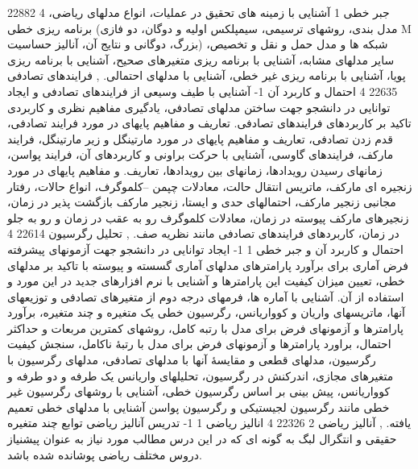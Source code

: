 \documentclass[class=article, crop=false]{standalone}
\begin{document}
{{{        }{
            22882
        }{
            4
        }{
            جبر خطی 1
        }{}{{
            آشنایی با زمینه های تحقیق در عملیات، انواع مدلهای ریاضی، برنامه ریزی خطی (مدل بندی، روشهای ترسیمی، سیمپلکس اولیه و دوگان، دو فازی M بزرگ، دوگانی و نتایج آن، آنالیز حساسیت) شبکه ها و مدل حمل و نقل و تخصیص، سایر مدلهای مشابه، آشنایی با برنامه ریزی متغیرهای صحیح، آشنایی با برنامه ریزی پویا، آشنایی با برنامه ریزی غیر خطی، آشنایی با مدلهای احتمالی.
        }}
        },{{
            فرایندهای تصادفی
        }{
            22635
        }{
            4
        }{
            احتمال و کاربرد آن
        }{{
            1- آشنایی با طیف وسیعی از فرایندهای تصادفی و ایجاد توانایی در دانشجو جهت ساختن مدلهای تصادفی، یادگیری مفاهیم نظری و کاربردی تاکید بر کاربردهای فرایندهای تصادفی.
        }}{{
            تعاریف و مفاهیم پایهای در مورد فرایند تصادفی، قدم زدن تصادفی، تعاریف و مفاهیم پایهای در مورد مارتینگل و زیر مارتینگل، فرایند مارکف، فرایندهای گاوسی، آشنایی با حرکت براونی و کاربردهای آن، فرایند پواسن، زمانهای رسیدن رویدادها، زمانهای بین رویدادها، تعاریف. و مفاهیم پایهای در مورد زنجیره ای مارکف، ماتریس انتقال حالت، معادلات چپمن –کلموگرف، انواع حالات، رفتار مجانبی زنجیر مارکف، احتمالهای حدی و ایستا، زنجیر مارکف بازگشت پذیر در زمان، زنجیرهای مارکف پیوسته در زمان، معادلات کلموگرف رو به عقب در زمان و رو به جلو در زمان، کاربردهای فرایندهای تصادفی مانند نظریه صف.
        }}
        },{{
            تحلیل رگرسیون
        }{
            22614
        }{
            4
        }{
            احتمال و کاربرد آن و جبر خطی 1
        }{{
            1- ایجاد توانایی در دانشجو جهت آزمونهای پیشرفته فرض آماری برای برآورد پارامترهای مدلهای آماری گسسته و پیوسته با تاکید بر مدلهای خطی، تعیین میزان کیفیت این پارامترها و آشنایی با نرم افزارهای جدید در این مورد و استفاده از آن.
        }}{{
            آشنایی با آماره ها، فرمهای درجه دوم از متغیرهای تصادفی و توزیعهای آنها، ماتریسهای واریان و کوواریانس، رگرسیون خطی یک متغیره و چند متغیره، برآورد پارامترها و آزمونهای فرض برای مدل با رتبه کامل، روشهای کمترین مربعات و حداکثر احتمال، براورد پارامترها و آزمونهای فرض برای مدل با رتبهٔ ناکامل، سنجش کیفیت رگرسیون، مدلهای قطعی و مقایسهٔ آنها با مدلهای تصادفی، مدلهای رگرسیون با متغیرهای مجازی، اندرکنش در رگرسیون، تحلیلهای واریانس یک طرفه و دو طرفه و کوواریانس، پیش بینی بر اساس رگرسیون خطی، آشنایی با روشهای رگرسیون غیر خطی مانند رگرسیون لجیستیکی و رگرسیون پواسن آشنایی با مدلهای خطی تعمیم یافته.
        }}
        },{{
            آنالیز ریاضی 2
        }{
            22326
        }{
            4
        }{
            انالیز ریاضی 1
        }{{
            1- تدریس آنالیز ریاضی توابع چند متغیره حقیقی و انتگرال لبگ به گونه ای که در این درس مطالب مورد نیاز به عنوان پیشنیاز دروس مختلف ریاضی پوشانده شده باشد.
}}}}
\end{document}
